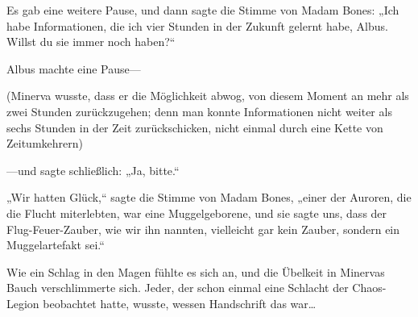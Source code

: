 Es gab eine weitere Pause, und dann sagte die Stimme von Madam Bones: „Ich habe Informationen, die ich vier Stunden in der Zukunft gelernt habe, Albus. Willst du sie immer noch haben?“

Albus machte eine Pause—

(Minerva wusste, dass er die Möglichkeit abwog, von diesem Moment an mehr als zwei Stunden zurückzugehen; denn man konnte Informationen nicht weiter als sechs Stunden in der Zeit zurückschicken, nicht einmal durch eine Kette von Zeitumkehrern)

—und sagte schließlich: „Ja, bitte.“

„Wir hatten Glück,“ sagte die Stimme von Madam Bones, „einer der Auroren, die die Flucht miterlebten, war eine Muggelgeborene, und sie sagte uns, dass der Flug-Feuer-Zauber, wie wir ihn nannten, vielleicht gar kein Zauber, sondern ein Muggelartefakt sei.“

Wie ein Schlag in den Magen fühlte es sich an, und die Übelkeit in Minervas Bauch verschlimmerte sich. Jeder, der schon einmal eine Schlacht der Chaos-Legion beobachtet hatte, wusste, wessen Handschrift das war…

